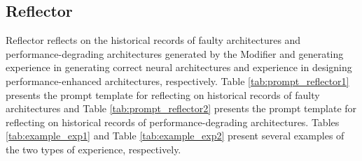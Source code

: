 \subsection{Reflector}
Reflector reflects on the historical records of faulty architectures and performance-degrading architectures generated by the Modifier and generating experience in generating correct neural architectures and experience in designing performance-enhanced architectures, respectively. Table \ref{tab:prompt_reflector1} presents the prompt template for reflecting on historical records of faulty architectures and Table \ref{tab:prompt_reflector2} presents the prompt template for reflecting on historical records of performance-degrading architectures. Tables \ref{tab:example_exp1} and Table \ref{tab:example_exp2} present several examples of the two types of experience, respectively.
\begin{table}[t]
    \centering
    \caption{Prompt template for reflecting on the historical records of faulty architectures.}
    \label{tab:prompt_reflector1}
\end{table}
\clearpage
